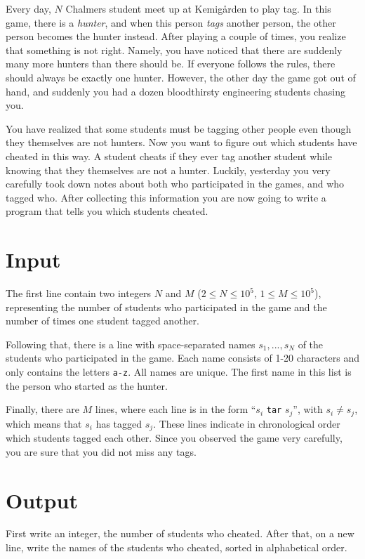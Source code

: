 Every day, $N$ Chalmers student meet up at Kemigården to play tag.
In this game, there is a \emph{hunter}, and when this person
\emph{tags} another person, the other person becomes the hunter instead.
After playing a couple of times, you realize that something is not right.
Namely, you have noticed that there are suddenly many more hunters than there should be.
If everyone follows the rules, there should always be exactly one hunter.
However, the other day the game got out of hand,
and suddenly you had a dozen bloodthirsty engineering students chasing you.

You have realized that some students must be tagging other people even though they themselves are not hunters.
Now you want to figure out which students have cheated in this way.
A student cheats if they ever tag another student while knowing that they themselves are not a hunter.
Luckily, yesterday you very carefully took down notes about both who participated in the games, and who tagged who.
After collecting this information you are now going to write a program that tells you which students cheated.

\section*{Input}

The first line contain two integers $N$ and $M$ ($2 \leq N \leq 10^5$, $1 \leq M \leq 10^5$), 
representing the number of students who participated in the game 
and the number of times one student tagged another.

Following that, there is a line with space-separated names $s_1, ..., s_N$ 
of the students who participated in the game. 
Each name consists of 1-20 characters and only contains the letters \texttt{a-z}. 
All names are unique. The first name in this list is the person who started as the hunter.

Finally, there are $M$ lines, where each line is in the form ``$s_i$ \texttt{tar} $s_j$'', 
with $s_i \neq s_j$, which means that $s_i$ has tagged $s_j$. These lines indicate in chronological order which students tagged each other. 
Since you observed the game very carefully, you are sure that you did not miss any tags.

\section*{Output}
First write an integer, the number of students who cheated.
After that, on a new line, write the names of the students who cheated,
sorted in alphabetical order.

